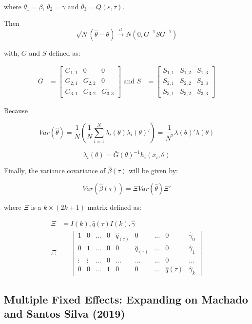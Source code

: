 \documentclass[
  letterpaper,
  DIV=11,
  numbers=noendperiod]{scrartcl}
\begin{document}
where \(\theta_1 = \beta\), \(\theta_2 = \gamma\) and
\(\theta_3 = Q(\varepsilon,\tau)\).

Then \[
\sqrt{N}(\hat\theta - \theta) \xrightarrow{d} N(0, G^{-1} S G^{-1})
\]

with, \(G\) and \(S\) defined as:

\[\begin{aligned}
G &= \begin{bmatrix}
G_{1,1} &       0 & 0       \\
G_{2,1} & G_{2,2} & 0       \\
G_{3,1} & G_{3,2} & G_{3,3} 
\end{bmatrix}  \text{ and }
S &= \begin{bmatrix}
S_{1,1} & S_{1,2} & S_{1,3}    \\
S_{2,1} & S_{2,2} & S_{2,3}  \\
S_{3,1} & S_{3,2} & S_{3,3} 
\end{bmatrix}
\end{aligned}
\]

Because

\[
Var(\hat\theta) = \frac{1}{N} \left(
    \frac{1}{N} 
    \sum_{i=1}^N  \lambda_i(\theta) \lambda_i(\theta)'  
\right) = \frac{1}{N^2} 
\lambda(\theta)'\lambda(\theta)
\]

\[
\lambda_i(\theta) = \bar G(\theta)^{-1} h_i (x_i,\theta)
\]

Finally, the variance covariance of \(\hat \beta(\tau)\) will be given
by:

\[Var(\hat\beta(\tau)) = \Xi Var(\hat\theta) \Xi'\]

where \(\Xi\) is a \(k \times (2k+1)\) matrix defined as:

\[
\begin{aligned}
    \Xi &= I(k), \hat q(\tau) I(k), \hat \gamma \\
    \Xi &= \left[ \begin{array}{cccc|cccc|}
           1 & 0 & \dots & 0 &\hat q_(\tau) & 0 & ... & 0  & \hat\gamma_0 \\
           0 & 1 & \dots & 0 &0& \hat q_(\tau) & ... & 0 & \hat\gamma_1 \\
          \vdots & \vdots & \dots & 0 &...&...& ... & 0             & ...\\
           0 & 0 & \dots & 1 &0 & 0 & ... & \hat q(\tau)   & \hat\gamma_k
        \end{array} \right]         
\end{aligned}
\]

\hypertarget{multiple-fixed-effects-expanding-on-mss2019}{%
\subsection{Multiple Fixed Effects: Expanding on Machado and Santos
Silva (2019)}\label{multiple-fixed-effects-expanding-on-mss2019}}
\end{document}
